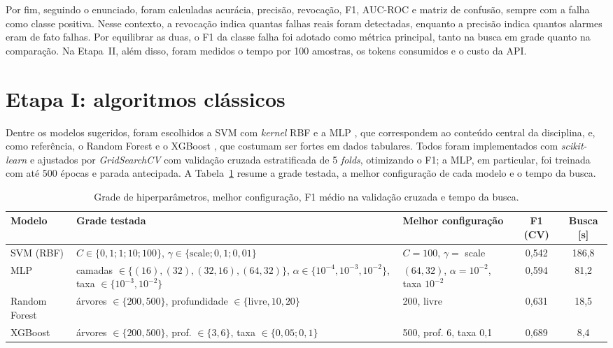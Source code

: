 \documentclass[12pt]{article}
\begin{document}
Por fim, seguindo o enunciado, foram calculadas acurácia, precisão, revocação, F1, AUC-ROC e matriz de confusão, sempre com a falha como classe positiva. Nesse contexto, a revocação indica quantas falhas reais foram detectadas, enquanto a precisão indica quantos alarmes eram de fato falhas. Por equilibrar as duas, o F1 da classe falha foi adotado como métrica principal, tanto na busca em grade quanto na comparação. Na Etapa~II, além disso, foram medidos o tempo por 100 amostras, os tokens consumidos e o custo da API.

\section{Etapa I: algoritmos clássicos}\label{sec:etapa1}

Dentre os modelos sugeridos, foram escolhidos a SVM com \textit{kernel} RBF \cite{cortes1995} e a MLP \cite{haykin2009}, que correspondem ao conteúdo central da disciplina, e, como referência, o Random Forest \cite{breiman2001} e o XGBoost \cite{chen2016}, que costumam ser fortes em dados tabulares. Todos foram implementados com \textit{scikit-learn} \cite{pedregosa2011} e ajustados por \textit{GridSearchCV} com validação cruzada estratificada de 5 \textit{folds}, otimizando o F1; a MLP, em particular, foi treinada com até 500 épocas e parada antecipada. A Tabela~\ref{tab:grade} resume a grade testada, a melhor configuração de cada modelo e o tempo da busca.

\begin{table}[ht]
\centering
\caption{Grade de hiperparâmetros, melhor configuração, F1 médio na validação cruzada e tempo da busca.}
\label{tab:grade}
\footnotesize
\begin{tabular}{l>{\raggedright}p{4.9cm}>{\raggedright}p{3.6cm}cc}
\toprule
Modelo & Grade testada & Melhor configuração & F1 (CV) & Busca [s] \tabularnewline
\midrule
SVM (RBF) & $C \in \{0{,}1;1;10;100\}$, $\gamma \in \{\text{scale};0{,}1;0{,}01\}$ & $C=100$, $\gamma=$ scale & 0,542 & 186,8 \tabularnewline
MLP & camadas $\in \{(16),(32),(32,16),(64,32)\}$, $\alpha \in \{10^{-4},10^{-3},10^{-2}\}$, taxa $\in \{10^{-3},10^{-2}\}$ & $(64,32)$, $\alpha=10^{-2}$, taxa $10^{-2}$ & 0,594 & 81,2 \tabularnewline
Random Forest & árvores $\in \{200,500\}$, profundidade $\in \{\text{livre},10,20\}$ & 200, livre & 0,631 & 18,5 \tabularnewline
XGBoost & árvores $\in \{200,500\}$, prof. $\in \{3,6\}$, taxa $\in \{0{,}05;0{,}1\}$ & 500, prof. 6, taxa 0,1 & 0,689 & 8,4 \tabularnewline
\bottomrule
\end{tabular}
\end{table}
\end{document}
